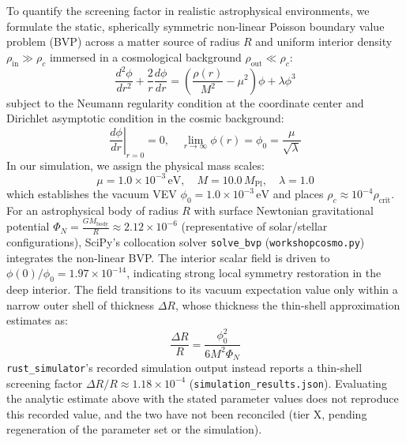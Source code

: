 \documentclass[11pt,a4paper]{article}
\newcommand{\numreconcile}[2]{#1}
\begin{document}
To quantify the screening factor in realistic astrophysical environments, we formulate the static, spherically symmetric non-linear Poisson boundary value problem (BVP) across a matter source of radius $R$ and uniform interior density $\rho_{\text{in}} \gg \rho_c$ immersed in a cosmological background $\rho_{\text{out}} \ll \rho_c$:
\begin{equation}
\frac{d^2\phi}{dr^2} + \frac{2}{r}\frac{d\phi}{dr} = \left(\frac{\rho(r)}{M^2} - \mu^2\right)\phi + \lambda \phi^3
\end{equation}
subject to the Neumann regularity condition at the coordinate center and Dirichlet asymptotic condition in the cosmic background:
\begin{equation}
\left.\frac{d\phi}{dr}\right|_{r=0} = 0, \quad \lim_{r \to \infty} \phi(r) = \phi_0 = \frac{\mu}{\sqrt{\lambda}}
\end{equation}
In our simulation, we assign the physical mass scales:
\begin{equation}
\mu = 1.0 \times 10^{-3}\,\text{eV}, \quad M = 10.0\,M_{\text{Pl}}, \quad \lambda = 1.0
\end{equation}
which establishes the vacuum VEV $\phi_0 = 1.0 \times 10^{-3}\,\text{eV}$ and places $\rho_c \approx 10^{-4} \rho_{\text{crit}}$. For an astrophysical body of radius $R$ with surface Newtonian gravitational potential $\Phi_N = \frac{G M_{\text{body}}}{R} \approx 2.12 \times 10^{-6}$ (representative of solar/stellar configurations), SciPy's collocation solver \texttt{solve\_bvp} (\texttt{workshopcosmo.py}) integrates the non-linear BVP. The interior scalar field is driven to $\phi(0)/\phi_0 = \numreconcile{1.97\times 10^{-14}}{\texttt{interior\_suppression}}$, indicating strong local symmetry restoration in the deep interior. The field transitions to its vacuum expectation value only within a narrow outer shell of thickness $\Delta R$, whose thickness the thin-shell approximation estimates as:
\begin{equation}
\frac{\Delta R}{R} = \frac{\phi_0^2}{6 M^2 \Phi_N}
\end{equation}
\texttt{rust\_simulator}'s recorded simulation output instead reports a thin-shell screening factor $\Delta R / R \approx \numreconcile{1.18\times 10^{-4}}{\texttt{screening\_factor}}$ (\texttt{simulation\_results.json}). Evaluating the analytic estimate above with the stated parameter values does not reproduce this recorded value, and the two have not been reconciled (tier X, pending regeneration of the parameter set or the simulation).
\end{document}
